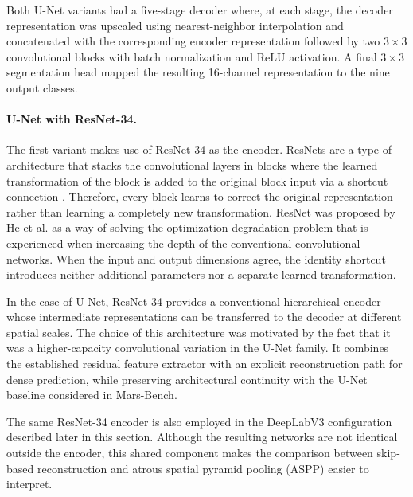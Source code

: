 Both U-Net variants had a five-stage decoder where, at each stage, the decoder representation was upscaled using nearest-neighbor interpolation and concatenated with the corresponding encoder representation followed by two \(3 \times 3\) convolutional blocks with batch normalization and ReLU activation. A final \(3 \times 3\) segmentation head mapped the resulting 16-channel representation to the nine output classes.

\paragraph{U-Net with ResNet-34.}

The first variant makes use of ResNet-34 as the encoder. ResNets are a type of architecture that stacks the convolutional layers in blocks where the learned transformation of the block is added to the original block input via a shortcut connection \cite{he2016resnet}. Therefore, every block learns to correct the original representation rather than learning a completely new transformation. ResNet was proposed by He et al. as a way of solving the optimization degradation problem that is experienced when increasing the depth of the conventional convolutional networks. When the input and output dimensions agree, the identity shortcut introduces neither additional parameters nor a separate learned transformation.

In the case of U-Net, ResNet-34 provides a conventional hierarchical encoder whose intermediate representations can be transferred to the decoder at different spatial scales. The choice of this architecture was motivated by the fact that it was a higher-capacity convolutional variation in the U-Net family. It combines the established residual feature extractor with an explicit reconstruction path for dense prediction, while preserving architectural continuity with the U-Net baseline considered in Mars-Bench.

The same ResNet-34 encoder is also employed in the DeepLabV3 configuration described later in this section. Although the resulting networks are not identical outside the encoder, this shared component makes the comparison between skip-based reconstruction and atrous spatial pyramid pooling (ASPP) easier to interpret.

